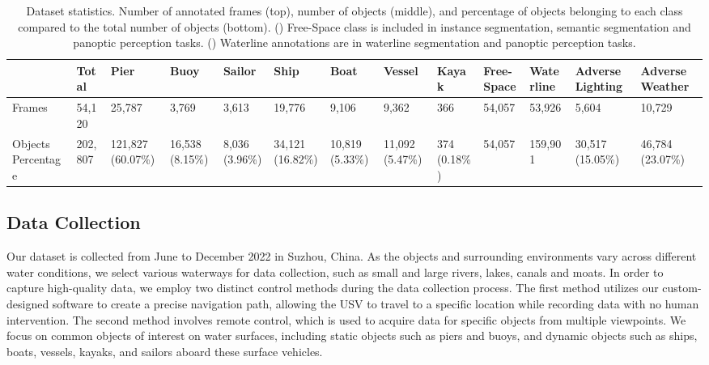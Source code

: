 \documentclass[lettersize,journal]{IEEEtran}
\begin{document}
\begin{table*}[!h]
\caption{Dataset statistics. Number of annotated frames (top), number of objects (middle), and percentage of objects belonging to each class compared to the total number of objects (bottom). () Free-Space class is included in instance segmentation, semantic segmentation and panoptic perception tasks. () Waterline annotations are in waterline segmentation and panoptic perception tasks.}
\setlength\tabcolsep{5pt} \center
\footnotesize
\begin{tabular*}{\linewidth}{p{1.3cm}<{}p{0.9cm}<{\centering}|p{0.9cm}<{\centering}p{0.9cm}<{\centering}p{0.9cm}<{\centering}p{0.9cm}<{\centering}p{0.9cm}<{\centering}p{0.9cm}<{\centering}p{0.9cm}<{\centering}|p{1.4cm}<{\centering}p{1.3cm}<{\centering}|p{1.1cm}<{\centering}p{1.1cm}<{\centering}}
\toprule

 & \bf{Total} & \bf{Pier} & \bf{Buoy} & \bf{Sailor} & \bf{Ship} & \bf{Boat} & \bf{Vessel} & \bf{Kayak} & \bf{Free-Space}  & \bf{Waterline}  & \bf{Adverse Lighting} & \bf{Adverse Weather} \\\midrule
Frames & 54,120 & 25,787 & 3,769 & 3,613 & 19,776 & 9,106 & 9,362 & 366 & 54,057 & 53,926 & 5,604 & 10,729  \\
Objects Percentage & 202,807 & 121,827 (60.07\%) & 16,538 (8.15\%) & 8,036 (3.96\%) & 34,121 (16.82\%) & 10,819 (5.33\%) & 11,092 (5.47\%) & 374 (0.18\%) & 54,057 & 159,901 & 30,517 (15.05\%) & 46,784 (23.07\%)    \\
\bottomrule
\end{tabular*}
\label{tab:waterscenes-statistics}
\end{table*}

\subsection{Data Collection}
Our dataset is collected from June to December 2022 in Suzhou, China. 
As the objects and surrounding environments vary across different water conditions, we select various waterways for data collection, such as small and large rivers, lakes, canals and moats.
In order to capture high-quality data, we employ two distinct control methods during the data collection process. 
The first method utilizes our custom-designed software to create a precise navigation path, allowing the USV to travel to a specific location while recording data with no human intervention. The second method involves remote control, which is used to acquire data for specific objects from multiple viewpoints.
We focus on common objects of interest on water surfaces, including static objects such as piers and buoys, and dynamic objects such as ships, boats, vessels, kayaks, and sailors aboard these surface vehicles.
\end{document}
